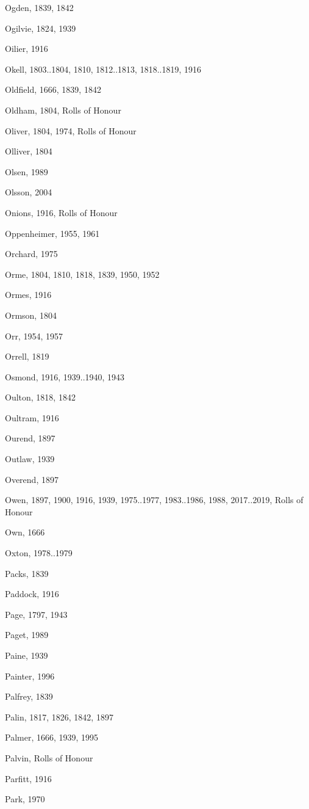 {\begin{theindex}
\item Ogden, 1839, 1842
\item Ogilvie, 1824, 1939
\item Oilier, 1916
\item Okell, 1803..1804, 1810, 1812..1813, 1818..1819, 1916
\item Oldfield, 1666, 1839, 1842
\item Oldham, 1804, Rolls of Honour
\item Oliver, 1804, 1974, Rolls of Honour
\item Olliver, 1804
\item Olsen, 1989
\item Olsson, 2004
\item Onions, 1916, Rolls of Honour
\item Oppenheimer, 1955, 1961
\item Orchard, 1975
\item Orme, 1804, 1810, 1818, 1839, 1950, 1952
\item Ormes, 1916
\item Ormson, 1804
\item Orr, 1954, 1957
\item Orrell, 1819
\item Osmond, 1916, 1939..1940, 1943
\item Oulton, 1818, 1842
\item Oultram, 1916
\item Ourend, 1897
\item Outlaw, 1939
\item Overend, 1897
\item Owen, 1897, 1900, 1916, 1939, 1975..1977, 1983..1986, 1988, 2017..2019, Rolls of Honour
\item Own, 1666
\item Oxton, 1978..1979
\item Packs, 1839
\item Paddock, 1916
\item Page, 1797, 1943
\item Paget, 1989
\item Paine, 1939
\item Painter, 1996
\item Palfrey, 1839
\item Palin, 1817, 1826, 1842, 1897
\item Palmer, 1666, 1939, 1995
\item Palvin, Rolls of Honour
\item Parfitt, 1916
\item Park, 1970

\end{theindex}}
